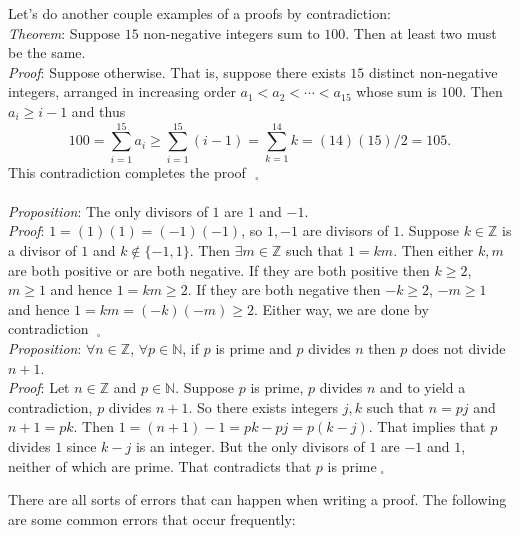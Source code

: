\documentclass[12pt]{amsart}
\theoremstyle{definition}
\theoremstyle{remark}
\newcommand{\nats}{\mathbb N}
\newcommand{\ints}{\mathbb Z}
\begin{document}
Let's do another couple examples of a proofs by contradiction:\\


\emph{Theorem}:  Suppose $15$ non-negative integers sum to $100$.  Then at least two must be the same.\\

\emph{Proof}:  Suppose otherwise.  That is, suppose there exists $15$ distinct non-negative integers, arranged in increasing order $a_{1}<a_{2}<\cdots<a_{15}$ whose sum is $100$.  Then $a_{i}\geq i-1$ and thus $$ 100= \sum_{i=1}^{15}a_{i}\geq \sum_{i=1}^{15}(i-1)=\sum_{k=1}^{14}k=(14)(15)/2=105.$$ This contradiction completes the proof$\mbox{ }_{\square}$\\ \\


\emph{Proposition}:  The only divisors of $1$ are $1$ and $-1$.\\

\emph{Proof}:  $1=(1)(1)=(-1)(-1)$, so $1,-1$ are divisors of $1$.  Suppose $k\in\ints$ is a divisor of $1$ and $k\not\in \{-1,1\}$.  Then $\exists m\in\ints$ such that $1=km$.  Then either $k,m$ are both positive or are both negative.  If they are both positive then $k\geq 2$, $m\geq 1$ and hence $1=km\geq 2$.  If they are both negative then $-k\geq 2$, $-m\geq 1$ and hence $1=km=(-k)(-m)\geq 2$.  Either way, we are done by contradiction $\;_{\square}$\\



\emph{Proposition}:  $\forall n\in\ints$, $\forall p\in\nats$, if $p$ is prime and $p$ divides $n$ then $p$ does not divide $n+1$.\\

\emph{Proof}:  Let $n\in\ints$ and $p\in\nats$.  Suppose $p$ is prime, $p$ divides $n$ and to yield a contradiction, $p$ divides $n+1$.  So there exists integers $j,k$ such that $n=pj$ and $n+1=pk$.  Then $1=(n+1)-1=pk-pj=p(k-j)$.  That implies that $p$ divides $1$ since $k-j$ is an integer.  But the only divisors of $1$ are $-1$ and $1$, neither of which are prime.  That contradicts that $p$ is prime$\;_{\square}$

\newpage

There are all sorts of errors that can happen when writing a proof.  The following are some common errors that occur frequently:\\
\end{document}
